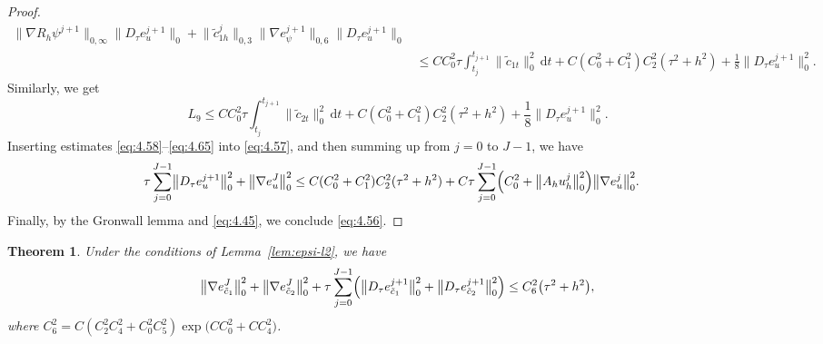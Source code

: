 \documentclass[a4paper,fleqn]{cas-sc}
\numberwithin{equation}{section}
\newtheorem{theorem}{Theorem}[section]
\theoremstyle{definition}
\begin{document}
\begin{proof}
\begin{align}
    \bigl\|\nabla R_{h}\psi^{j+1}\bigr\|_{0,\infty}
    \bigl\|D_{\tau}e_{u}^{j+1}\bigr\|_{0}
  + \bigl\|\tilde{c}_{1h}^{j}\bigr\|_{0,3}
    \bigl\|\nabla e_{\psi}^{j+1}\bigr\|_{0,6}
    \bigl\|D_{\tau}e_{u}^{j+1}\bigr\|_{0}
  \nonumber\\
  &\leq CC_{0}^{2}\tau\int_{t_{j}}^{t_{j+1}}\|\tilde{c}_{1t}\|_{0}^{2}\,\mathrm{d}t
    + C(C_{0}^{2}+C_{1}^{2})C_{2}^{2}(\tau^{2}+h^{2})
    + \frac{1}{8}\bigl\|D_{\tau}e_{u}^{j+1}\bigr\|_{0}^{2}.
  \label{eq:4.64}
\end{align}
Similarly, we get
\begin{equation}\label{eq:4.65}
  L_{9} \leq CC_{0}^{2}\tau\int_{t_{j}}^{t_{j+1}}\|\tilde{c}_{2t}\|_{0}^{2}\,\mathrm{d}t
           + C(C_{0}^{2}+C_{1}^{2})C_{2}^{2}(\tau^{2}+h^{2})
           + \frac{1}{8}\bigl\|D_{\tau}e_{u}^{j+1}\bigr\|_{0}^{2}.
\end{equation}
Inserting estimates \eqref{eq:4.58}--\eqref{eq:4.65} into \eqref{eq:4.57}, and then summing up
from $j = 0$ to $J-1$, we have
\begin{align}
  \tau\sum_{j=0}^{J-1}\bigl\|D_{\tau}e_{u}^{j+1}\bigr\|_{0}^{2}
  + \bigl\|\nabla e_{u}^{J}\bigr\|_{0}^{2}
  &\leq C(C_{0}^{2}+C_{1}^{2})C_{2}^{2}(\tau^{2}+h^{2})
   + C\tau\sum_{j=0}^{J-1}\Bigl(C_{0}^{2}
                                 + \bigl\|A_{h}u_{h}^{j}\bigr\|_{0}^{2}\Bigr)
    \bigl\|\nabla e_{u}^{j}\bigr\|_{0}^{2}.
  \label{eq:4.66}
\end{align}
Finally, by the Gronwall lemma and \eqref{eq:4.45}, we conclude \eqref{eq:4.56}.
\end{proof}

\begin{theorem}\label{thm:H1-c}
Under the conditions of Lemma~\ref{lem:epsi-l2}, we have
\begin{equation}\label{eq:4.67}
  \bigl\|\nabla e_{\tilde{c}_{1}}^{J}\bigr\|_{0}^{2}
  + \bigl\|\nabla e_{\tilde{c}_{2}}^{J}\bigr\|_{0}^{2}
  + \tau\sum_{j=0}^{J-1}\Bigl(\bigl\|D_{\tau}e_{\tilde{c}_{1}}^{j+1}\bigr\|_{0}^{2}
                              + \bigl\|D_{\tau}e_{\tilde{c}_{2}}^{j+1}\bigr\|_{0}^{2}\Bigr)
  \leq C_{6}^{2}\bigl(\tau^{2} + h^{2}\bigr),
\end{equation}
where $C_{6}^{2} = C(C_{2}^{2}C_{4}^{2} + C_{0}^{2}C_{5}^{2})
\exp\!\bigl(CC_{0}^{2} + CC_{4}^{2}\bigr)$.
\end{theorem}
\end{document}
